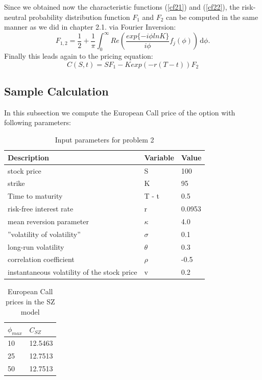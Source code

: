 \documentclass[a4paper,11pt]{article}
\begin{document}
Since we obtained now the characteristic functions (\ref{cf21}) and (\ref{cf22}), the risk-neutral probability distribution function  $F_1$ and $F_2$ can be computed in the same manner as we did in chapter 2.1. via Fourier Inversion:
\begin{equation}
F_{1,2}=\dfrac{1}{2}+\dfrac{1}{\pi}\int_0^{\infty} \! Re\left(\dfrac{exp\{-i\phi ln K\}}{i\phi} f_j(\phi) \right) \, \mathrm{d}\phi.
\label{CDF2}
\end{equation}
Finally this leads again to the pricing equation:
\begin{equation}
C(S,t)= SF_1 - Kexp(-r(T-t))F_2
\label{BSMVOLA}
\end{equation}
\newpage
\subsection{Sample Calculation}
In this subsection we compute the European Call price of the option with following parameters:

\begin{table}[h!]
\centering
\caption{Input parameters for problem 2}
\label{my-label}
\begin{tabular}{l|l|l}
\textbf{Description} & \textbf{Variable} & \textbf{Value}  \\\hline
 stock price& S  & 100  \\
 strike& K  & 95 \\
 Time to maturity& T - t  & 0.5 \\
 risk-free interest rate& r & 0.0953 \\
mean reversion parameter& $\kappa$ & 4.0  \\
 ''volatility of volatility''& $\sigma$ & 0.1 \\
  long-run volatility& $\theta$ & 0.3 \\
   correlation coefficient& $\rho$ & -0.5 \\
   instantaneous volatility of the stock price& v & 0.2 \\
\end{tabular}
\end{table}
\begin{table}[h!]
\caption{European Call prices in the SZ model}
\label{result2}
\centering
\begin{tabular}{l|l}
 \textbf{$\phi_{max}$} & \textbf{$C_{SZ}$}  \\\hline
  10 & 12.5463\\
 25  & 12.7513  \\
 50 & 12.7513 \\
\end{tabular}
\end{table}
\end{document}
